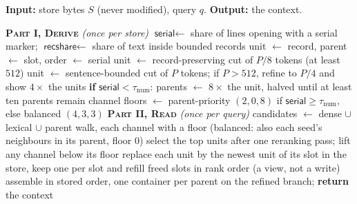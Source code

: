 \documentclass{article}
\newcommand{\sys}{\textsc{Muster}}
\newcommand{\serial}{\textsf{serial}}
\newcommand{\cov}{\textsf{recshare}}
\begin{document}
\begin{algorithm}[H]
\small
\caption{\sys{}. Part~I runs detection, including the policy gate (step~11), once per store with no model. Part~II (retrieval and context assembly) answers a query with one embedding, one rerank and one reader call. $\tau_{\mathrm{num}}=0.80$ and $\tau_{\mathrm{rec}}=0.90$, and $P$ is the benchmark's chunk ($512$ or $4096$, Table~\ref{tab:hyper}). LongMemEval keeps its delivered rounds and sessions as units and parents (Section~\ref{sec:rule}).}
\label{alg:muster}
\footnotesize
\textbf{Input:} store bytes $S$ (never modified), query $q$. \textbf{Output:} the context.
\begin{algorithmic}[1]
\STATE \textbf{\textsc{Part I, Derive}} \emph{(once per store)}
\STATE $\serial \gets$ share of lines opening with a serial marker; $\cov \gets$ share of text inside bounded records
\IF{$\serial \ge \tau_{\mathrm{num}}$}
  \STATE unit $\gets$ record, parent $\gets$ slot, order $\gets$ serial
\ELSIF{$\cov \ge \tau_{\mathrm{rec}}$}
  \STATE unit $\gets$ record-preserving cut of $P/8$ tokens (at least $512$)
\ELSE
  \STATE unit $\gets$ sentence-bounded cut of $P$ tokens; if $P>512$, refine to $P/4$ and show $4\times$ the units
\ENDIF
\STATE \textbf{if} $\serial < \tau_{\mathrm{num}}$: parents $\gets$ $8\times$ the unit, halved until at least ten parents remain
\STATE channel floors $\gets$ parent-priority $(2,0,8)$ if $\serial \ge \tau_{\mathrm{num}}$, else balanced $(4,3,3)$
\STATE \textbf{\textsc{Part II, Read}} \emph{(once per query)}
\STATE candidates $\gets$ dense $\cup$ lexical $\cup$ parent walk, each channel with a floor (balanced: also each seed's neighbours in its parent, floor $0$)
\STATE select the top units after one reranking pass; lift any channel below its floor\label{alg:lift}
 \STATE replace each unit by the newest unit of its slot in the store, keep one per slot and refill freed slots in rank order (a view, not a write) \ENDIF
\STATE assemble in stored order, one container per parent on the refined branch; \textbf{return} the context
\end{algorithmic}
\end{algorithm}
\end{document}
